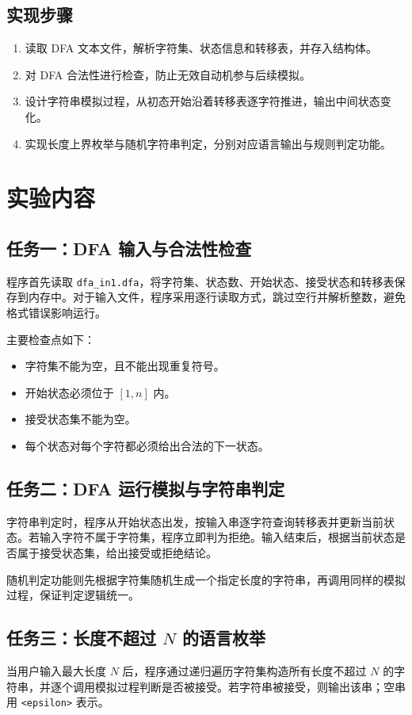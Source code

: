 \documentclass[12pt,a4paper]{ctexart}
\begin{document}
\subsection{实现步骤}
\begin{enumerate}
  \item 读取 DFA 文本文件，解析字符集、状态信息和转移表，并存入结构体。
  \item 对 DFA 合法性进行检查，防止无效自动机参与后续模拟。
  \item 设计字符串模拟过程，从初态开始沿着转移表逐字符推进，输出中间状态变化。
  \item 实现长度上界枚举与随机字符串判定，分别对应语言输出与规则判定功能。
\end{enumerate}

\section{实验内容}
\subsection{任务一：DFA 输入与合法性检查}
程序首先读取 \texttt{dfa\_in1.dfa}，将字符集、状态数、开始状态、接受状态和转移表保存到内存中。对于输入文件，程序采用逐行读取方式，跳过空行并解析整数，避免格式错误影响运行。

主要检查点如下：
\begin{itemize}
  \item 字符集不能为空，且不能出现重复符号。
  \item 开始状态必须位于 $[1, n]$ 内。
  \item 接受状态集不能为空。
  \item 每个状态对每个字符都必须给出合法的下一状态。
\end{itemize}

\subsection{任务二：DFA 运行模拟与字符串判定}
字符串判定时，程序从开始状态出发，按输入串逐字符查询转移表并更新当前状态。若输入字符不属于字符集，程序立即判为拒绝。输入结束后，根据当前状态是否属于接受状态集，给出接受或拒绝结论。

随机判定功能则先根据字符集随机生成一个指定长度的字符串，再调用同样的模拟过程，保证判定逻辑统一。

\subsection{任务三：长度不超过 $N$ 的语言枚举}
当用户输入最大长度 $N$ 后，程序通过递归遍历字符集构造所有长度不超过 $N$ 的字符串，并逐个调用模拟过程判断是否被接受。若字符串被接受，则输出该串；空串用 \texttt{<epsilon>} 表示。
\end{document}
